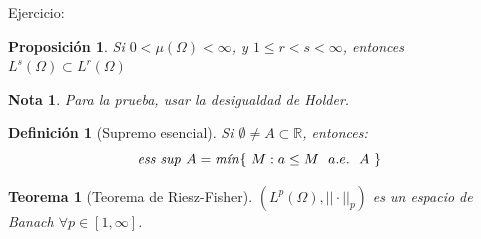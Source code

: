 \documentclass[11pt, a4paper]{article}
\newif\IfInSansMode
\newcommand{\R}{\mathbb{R}} \newcommand{\N}{\mathbb{N}}
\theoremstyle{theorem-style}
\newtheorem{nth}{Teorema}[section]
\newtheorem{nprop}{Proposición}[section]
\theoremstyle{definition-style}
\newtheorem{ndef}{Definición}[section]
\theoremstyle{remark-style}
\newtheorem*{nota}{Nota}
\theoremstyle{example-style}
\begin{document}
Ejercicio:
\begin{nprop}
  Si $0 < \mu(\Omega) < \infty$, y $1\leq r < s < \infty $, entonces $L^s(\Omega) \subset L^r(\Omega)$
\end{nprop}
\begin{nota}
  Para la prueba, usar la desigualdad de Holder.
\end{nota}

\begin{ndef}[Supremo esencial]
  Si $\emptyset \ne A \subset \R$, entonces:
  \[
    \text{\textit{ess sup }} A = \text{\textit{mín}}\{ \ M : a \leq M \ \ a.e. \ \ A \ \}
  \]
\end{ndef}

\begin{nth}[Teorema de Riesz-Fisher]
  $( L^p(\Omega), || \cdot ||_p)$ es un espacio de Banach $\forall p \in [1,\infty]$.
\end{nth}
\end{document}

